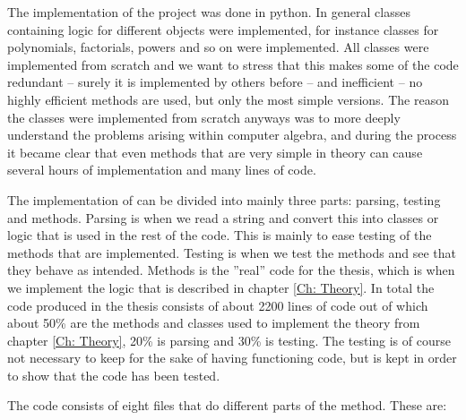 The implementation of the project was done in python. In general classes containing logic for different objects were implemented, for instance classes for polynomials, factorials, powers and so on were implemented. All classes were implemented from scratch and we want to stress that this makes some of the code redundant -- surely it is implemented by others before -- and inefficient -- no highly efficient methods are used, but only the most simple versions. The reason the classes were implemented from scratch anyways was to more deeply understand the problems arising within computer algebra, and during the process it became clear that even methods that are very simple in theory can cause several hours of implementation and many lines of code.

The implementation of \WZ can be divided into mainly three parts: parsing, testing and methods. Parsing is when we read a string and convert this into classes or logic that is used in the rest of the code. This is mainly to ease testing of the methods that are implemented. Testing is when we test the methods and see that they behave as intended. Methods is the ''real'' code for the thesis, which is when we implement the logic that is described in chapter \ref{Ch: Theory}. In total the code produced in the thesis consists of about 2200 lines of code out of which about 50\% are the methods and classes used to implement the theory from chapter \ref{Ch: Theory}, 20\% is parsing and 30\% is testing. The testing is of course not necessary to keep for the sake of having functioning code, but is kept in order to show that the code has been tested.

The code consists of eight files that do different parts of the method. These are:

